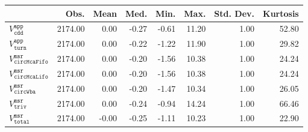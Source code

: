 \begin{tabular}{lrrrrrrr}
  \hline
 & Obs. & Mean & Med. & Min. & Max. & Std. Dev. & Kurtosis \\ 
  \hline
$V^{\mathtt{app}}_{\mathtt{cdd}}$ & 2174.00 & 0.00 & -0.27 & -0.61 & 11.20 & 1.00 & 52.80 \\ 
  $V^{\mathtt{app}}_{\mathtt{turn}}$ & 2174.00 & 0.00 & -0.22 & -1.22 & 11.90 & 1.00 & 29.82 \\ 
  $V^{\mathtt{msr}}_{\mathtt{circMcaFifo}}$ & 2174.00 & 0.00 & -0.20 & -1.56 & 10.38 & 1.00 & 24.24 \\ 
  $V^{\mathtt{msr}}_{\mathtt{circMcaLifo}}$ & 2174.00 & 0.00 & -0.20 & -1.56 & 10.38 & 1.00 & 24.24 \\ 
  $V^{\mathtt{msr}}_{\mathtt{circWba}}$ & 2174.00 & 0.00 & -0.20 & -1.47 & 10.34 & 1.00 & 26.05 \\ 
  $V^{\mathtt{msr}}_{\mathtt{triv}}$ & 2174.00 & 0.00 & -0.24 & -0.94 & 14.24 & 1.00 & 66.46 \\ 
  $V^{\mathtt{msr}}_{\mathtt{total}}$ & 2174.00 & -0.00 & -0.25 & -1.11 & 10.23 & 1.00 & 22.90 \\ 
   \hline
\end{tabular}
